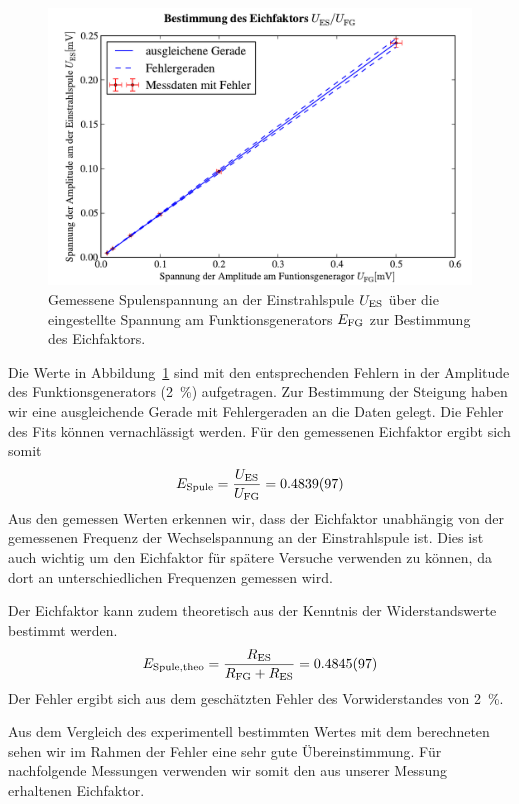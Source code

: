 \documentclass[paper=a4,
	fontsize=10pt,
	DIV=18,
	twocolumn,
	parskip=half
	]{scrartcl}
\numberwithin{equation}{section}    %
\begin{document}
\begin{figure}[htp]
	\includegraphics[width=\columnwidth]{Data-Plots/03-Effektivwert-es-fg.pdf}
	\caption{Gemessene Spulenspannung an der Einstrahlspule $U_{\rm ES}$ über die eingestellte Spannung am Funktionsgenerators $E_{\rm FG}$ zur Bestimmung des Eichfaktors.}
	\label{fig.eichfaktor}
\end{figure}

Die Werte in Abbildung~\ref{fig.eichfaktor} sind mit den entsprechenden Fehlern in der Amplitude des Funktionsgenerators (\SI{2}{\percent}) aufgetragen. Zur Bestimmung der Steigung haben wir eine ausgleichende Gerade mit Fehlergeraden an die Daten gelegt. Die Fehler des Fits können vernachlässigt werden.
Für den gemessenen Eichfaktor ergibt sich somit
\begin{equation}
	E_{\rm Spule} = \frac{U_{\rm ES}}{U_{\rm FG}} = \SI{0.4839(97)}{}
\end{equation}
Aus den gemessen Werten erkennen wir, dass der Eichfaktor unabhängig von der gemessenen Frequenz der Wechselspannung an der Einstrahlspule ist. Dies ist auch wichtig um den Eichfaktor für spätere Versuche verwenden zu können, da dort an unterschiedlichen Frequenzen gemessen wird.

Der Eichfaktor kann zudem theoretisch aus der Kenntnis der Widerstandswerte bestimmt werden. 
\begin{equation}
	E_{\rm Spule,theo} = \frac{R_{\rm ES}}{R_{\rm FG}+R_{\rm ES}} = \SI{0.4845(97)}{}
\end{equation}
Der Fehler ergibt sich aus dem geschätzten Fehler des Vorwiderstandes von \SI{2}{\percent}.

Aus dem Vergleich des experimentell bestimmten Wertes mit dem berechneten sehen wir im Rahmen der Fehler eine sehr gute Übereinstimmung. Für nachfolgende Messungen verwenden wir somit den aus unserer Messung erhaltenen Eichfaktor.
\end{document}

